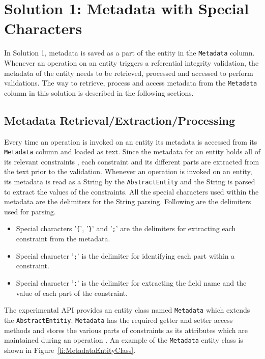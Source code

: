 
\section{Solution 1:  Metadata with Special Characters}
\label{s:Implementation-Solution1} 

In Solution 1,  metadata is saved as a part of the entity in the
\texttt{Metadata} column. Whenever an operation on an entity triggers a
referential integrity validation, the metadata of the entity needs to be
retrieved, processed and accessed to perform validations. The way to retrieve,
process and access  metadata from the \texttt{Metadata} column in this solution 
is described in
the following sections.

\subsection{Metadata Retrieval/Extraction/Processing}
\label{ss:MD-Retrieval-Sol1}

 Every time an operation is invoked on an entity its
metadata is accessed from its \texttt{Metadata} column and loaded as text. Since
the metadata for an entity holds all of its relevant constraints , each
constraint and its different parts are extracted from the text prior to the
validation.
Whenever an operation is invoked on an entity, its metadata is read as a String
by the \texttt{AbstractEntity} and the String is parsed to extract the values
of the constraints. All the special characters used within the
metadata are the delimiters for the String parsing. Following are the delimiters
used for parsing.
		\begin{itemize}
		  \item Special characters '\texttt{\{}', '\texttt{\}}' and '\texttt{;}' are
		  the delimiters for extracting each constraint from the metadata.
		  \item Special character '\texttt{;}' is the delimiter for identifying each
		  part within a constraint.
		  \item Special character '\texttt{:}' is the delimiter for extracting the
		  field name and the value of each part of the constraint.
		\end{itemize}
		
The experimental \ac{API} provides an entity class named \texttt{Metadata} which
extends the \texttt{AbstractEntitiy}. \texttt{Metadata} has the required getter
and setter access methods and stores the various parts of constraints as its
attributes which are maintained  during an operation . An example of the
\texttt{Metadata} entity class is shown in Figure~\ref{fi:MetadataEntityClass}.

